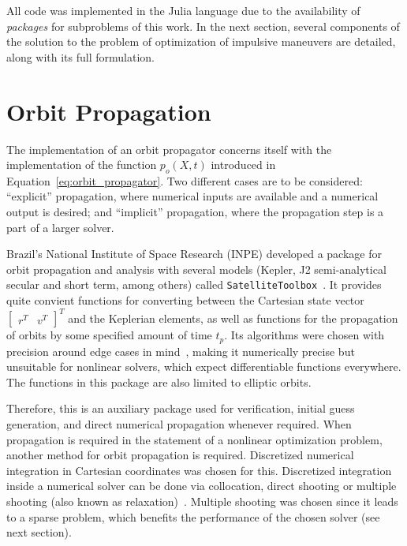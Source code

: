 
All code was implemented in the Julia language due to the availability of \textit{packages} for subproblems of this work. In the next section, several components of the solution to the problem of optimization of impulsive maneuvers are detailed, along with its full formulation.

\section{Orbit Propagation}\label{sec:orbit_propagation}

The implementation of an orbit propagator concerns itself with the implementation of the function \(p_o(X, t)\) introduced in Equation~\eqref{eq:orbit_propagator}. Two different cases are to be considered: ``explicit'' propagation, where numerical inputs are available and a numerical output is desired; and ``implicit'' propagation, where the propagation step is a part of a larger solver.

Brazil's National Institute of Space Research (INPE) developed a package for orbit propagation and analysis with several models (Kepler, J2 semi-analytical secular and short term, among others) called \texttt{SatelliteToolbox}~\cite{satellitetoolbox}. It provides quite convient functions for converting between the Cartesian state vector \(\begin{bmatrix}
    r^T & v^T
\end{bmatrix}^T\) and the Keplerian elements, as well as functions for the propagation of orbits by some specified amount of time \(t_p\). Its algorithms were chosen with precision around edge cases in mind~\cite{rv_to_kepler}, making it numerically precise but unsuitable for nonlinear solvers, which expect differentiable functions everywhere. The functions in this package are also limited to elliptic orbits.

Therefore, this is an auxiliary package used for verification, initial guess generation, and direct numerical propagation whenever required. When propagation is required in the statement of a nonlinear optimization problem, another method for orbit propagation is required. Discretized numerical integration in Cartesian coordinates was chosen for this. Discretized integration inside a numerical solver can be done via collocation, direct shooting or multiple shooting (also known as relaxation)~\cite{numerical_recipes}. Multiple shooting was chosen since it leads to a sparse problem, which benefits the performance of the chosen solver (see next section).

